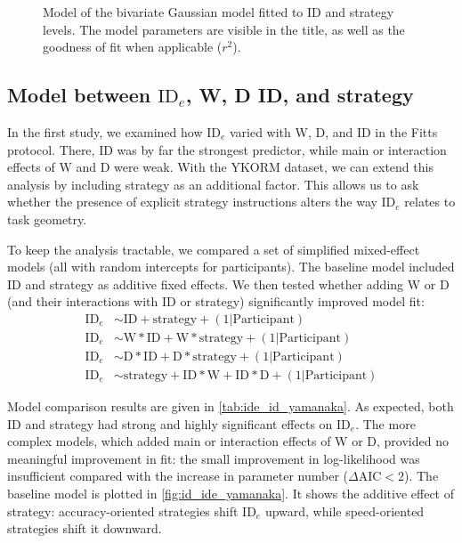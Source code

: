\documentclass[acmlarge, manuscript,review]{acmart}
\newcommand{\ide}{\ensuremath{{\text{ID}_e}}\xspace}
\newcommand{\D}{\ensuremath{{\text{D}}}\xspace}
\newcommand{\W}{\ensuremath{{\text{W}}}\xspace}
\begin{document}
\begin{figure}[htbp]
	\centering
	\caption{Model of the bivariate Gaussian model fitted to ID and strategy levels. The model parameters are visible in the title, as well as the goodness of fit when applicable ($r^2$).}
	\label{fig:biv_strategy_fit_yamanaka}
\end{figure}


\subsection{Model between \ide, W, D ID, and strategy}
In the first study, we examined how \ide varied with W, D, and ID in the Fitts protocol. There, ID was by far the strongest predictor, while main or interaction effects of W and D were weak. With the YKORM dataset, we can extend this analysis by including strategy as an additional factor. This allows us to ask whether the presence of explicit strategy instructions alters the way \ide relates to task geometry.


To keep the analysis tractable, we compared a set of simplified mixed-effect models (all with random intercepts for participants). The baseline model included ID and strategy as additive fixed effects. We then tested whether adding W or D (and their interactions with ID or strategy) significantly improved model fit:
\begin{align}
		\ide & \sim  \text{ID} + \text{strategy} + (1|\text{Participant})\label{eq:ide_id_yamanaka_short} \\
		\ide & \sim \W*\text{ID} + \W*\text{strategy} + (1|\text{Participant})\label{eq:ide_id_yamanaka_W}\\
	\ide & \sim \D*\text{ID} + \D*\text{strategy} + (1|\text{Participant})\label{eq:ide_id_yamanaka_D}\\
\ide & \sim \text{strategy} + \text{ID}*\W + \text{ID}*\D + (1|\text{Participant}) \label{eq:ide_id_yamanaka_full} 
\end{align}

Model comparison results are given in \autoref{tab:ide_id_yamanaka}. As expected, both ID and strategy had strong and highly significant effects on \ide. The more complex models, which added main or interaction effects of W or D, provided no meaningful improvement in fit: the small improvement in log-likelihood was insufficient compared with the increase in parameter number ($\Delta \text{AIC} < 2$). 
The baseline model is plotted in \autoref{fig:id_ide_yamanaka}. It shows the additive effect of strategy: accuracy-oriented strategies shift \ide upward, while speed-oriented strategies shift it downward. 
\end{document}
